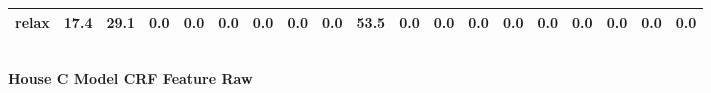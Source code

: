 \documentclass{article}
\begin{document}
\begin{sideways}
\begin{tabular}{lrrrrrrrrrrrrrrrrrr}
relax                         &        17.4 &               29.1 &           0.0 &                          0.0 &                0.0 &                0.0 &                        0.0 &          0.0 &             53.5 &                0.0 &                    0.0 &                      0.0 &                  0.0 &                   0.0 &              0.0 &              0.0 &                                  0.0 &          0.0 \\
\bottomrule
\end{tabular}
\end{sideways}
\normalsize
\vspace{1cm}\\
\textbf{House C Model CRF Feature Raw}\\
\vspace{1cm}\\
\end{document}
